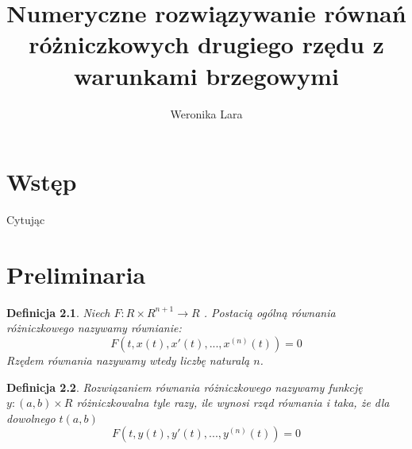 \documentclass[12pt,a4paper]{report}
\author{Weronika Lara}
\title{Numeryczne rozwiązywanie równań różniczkowych drugiego rzędu z warunkami brzegowymi}
\newtheorem{definition}{Definicja}
\begin{document}
\maketitle

\chapter{Wstęp}

Cytując \citep[Rozdział 3, sekcja 2]{palczewski2004rownania}

\chapter{Preliminaria}
\begin{definition}
Niech $F : R \times R^{n+1} \to R$ . Postacią ogólną równania różniczkowego nazywamy równianie: 
\begin{equation*}
F(t, x(t), x'(t),..., x^{(n)}(t)) = 0
\end{equation*} 
Rzędem równania nazywamy wtedy liczbę naturalą $n$. 
\end{definition}
\begin{definition}
Rozwiązaniem równania różniczkowego nazywamy funkcję $y:(a, b)\times R$ różniczkowalna tyle razy, ile wynosi rząd równania i taka, że dla dowolnego $t (a, b)$
\begin{equation*}
F(t, y(t), y'(t),..., y^{(n)}(t)) = 0
\end{equation*} 
\end{definition}
\end{document}
